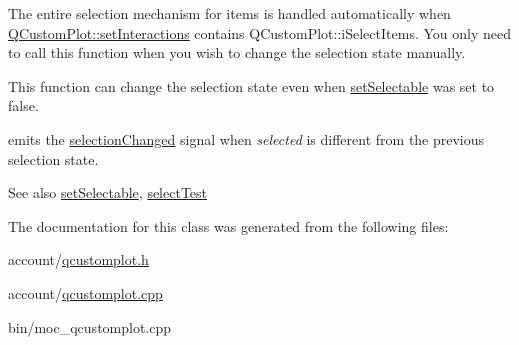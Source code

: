 \-The entire selection mechanism for items is handled automatically when \hyperlink{classQCustomPlot_a5ee1e2f6ae27419deca53e75907c27e5}{\-Q\-Custom\-Plot\-::set\-Interactions} contains \-Q\-Custom\-Plot\-::i\-Select\-Items. \-You only need to call this function when you wish to change the selection state manually.

\-This function can change the selection state even when \hyperlink{classQCPAbstractItem_a8a8e32a55bc478b849756a78c2d87fd2}{set\-Selectable} was set to false.

emits the \hyperlink{classQCPAbstractItem_aa5cffb034fc65dbb91c77e02c1c14251}{selection\-Changed} signal when {\itshape selected\/} is different from the previous selection state.

\begin{DoxySeeAlso}{\-See also}
\hyperlink{classQCPAbstractItem_a8a8e32a55bc478b849756a78c2d87fd2}{set\-Selectable}, \hyperlink{classQCPAbstractItem_a96d522d10ffc0413b9a366c6f7f0476b}{select\-Test} 
\end{DoxySeeAlso}


\-The documentation for this class was generated from the following files\-:\begin{DoxyCompactItemize}
\item 
account/\hyperlink{qcustomplot_8h}{qcustomplot.\-h}\item 
account/\hyperlink{qcustomplot_8cpp}{qcustomplot.\-cpp}\item 
bin/moc\-\_\-qcustomplot.\-cpp\end{DoxyCompactItemize}
